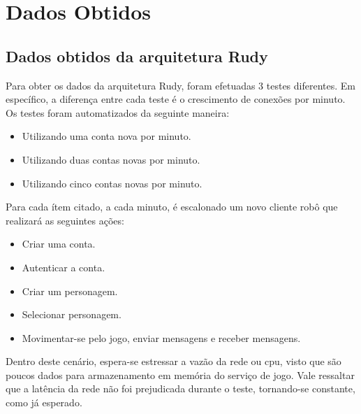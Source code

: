  
\chapter{Dados Obtidos}
\label{cap6}

\section{Dados obtidos da arquitetura Rudy}

Para obter os dados da arquitetura Rudy, foram efetuadas 3 testes diferentes.
%
Em específico, a diferença entre cada teste é o crescimento de conexões por minuto.
%
Os testes foram automatizados da seguinte maneira:

\begin{itemize}
 \item Utilizando uma conta nova por minuto.
 \item Utilizando duas contas novas por minuto.
 \item Utilizando cinco contas novas por minuto.
\end{itemize}

Para cada ítem citado, a cada minuto, é escalonado um novo cliente robô que realizará as seguintes ações:

\begin{itemize}
 \item Criar uma conta.
 \item Autenticar a conta.
 \item Criar um personagem.
 \item Selecionar personagem.
 \item Movimentar-se pelo jogo, enviar mensagens e receber mensagens.
\end{itemize}

Dentro deste cenário, espera-se estressar a vazão da rede ou \ac{cpu}, visto que são poucos dados para armazenamento em memória do serviço de jogo.
%
Vale ressaltar que a latência da rede não foi prejudicada durante o teste, tornando-se constante, como já esperado.


